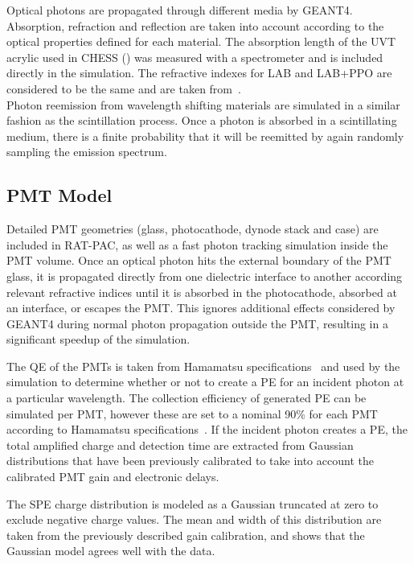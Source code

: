 Optical photons are propagated through different media by GEANT4. 
Absorption, refraction and reflection are taken into account according to the optical properties defined for each material. 
The absorption length of the UVT acrylic used in CHESS () was measured with a spectrometer and is included directly in the simulation.  
The refractive indexes for LAB and LAB+PPO are considered to be the same and are taken from~\cite{snop_private}. \\
Photon reemission from wavelength shifting materials are simulated in a similar fashion as the scintillation process. Once a photon is absorbed in a scintillating medium, there is a finite probability that it will be reemitted by again randomly sampling the emission spectrum.

\subsection{PMT Model \label{sec:pmt_model}}

Detailed PMT geometries (glass, photocathode, dynode stack and case) are included in RAT-PAC, as well as a fast photon tracking simulation inside the PMT volume. 
Once an optical photon hits the external boundary of the PMT glass, it is propagated directly from one dielectric interface to another according relevant refractive indices until it is absorbed in the photocathode, absorbed at an interface, or escapes the PMT.
This ignores additional effects considered by GEANT4 during normal photon propagation outside the PMT, resulting in a significant speedup of the simulation.

The QE of the PMTs is taken from Hamamatsu specifications~\cite{h11934} and used by the simulation to determine whether or not to create a PE for an incident photon at a particular wavelength. 
The collection efficiency of generated PE can be simulated per PMT, however these are set to a nominal 90\% for each PMT according to Hamamatsu specifications~\cite{hamamatsu}.  
If the incident photon creates a PE, the total amplified charge and detection time are extracted from Gaussian distributions that have been previously calibrated to take into account the calibrated PMT gain and electronic delays.

The SPE charge distribution is modeled as a Gaussian truncated at zero to exclude negative charge values. 
The mean and width of this distribution are taken from the previously described gain calibration, and  shows that the Gaussian model agrees well with the data.

